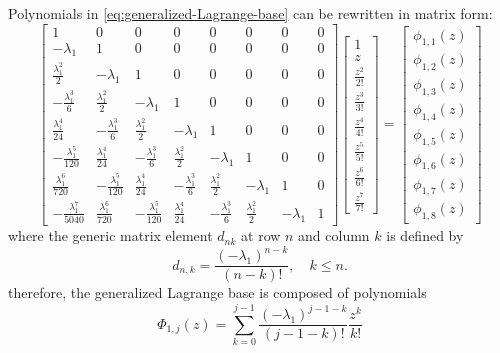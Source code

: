 Polynomials in \autoref{eq:generalized-Lagrange-base} can be rewritten in matrix form:
\begin{displaymath}
\left[\begin{matrix}1 & 0 & 0 & 0 & 0 & 0 & 0 & 0\\- \lambda_{1} & 1 & 0 & 0 & 0 & 0 & 0 & 0\\\frac{\lambda_{1}^{2}}{2} & - \lambda_{1} & 1 & 0 & 0 & 0 & 0 & 0\\- \frac{\lambda_{1}^{3}}{6} & \frac{\lambda_{1}^{2}}{2} & - \lambda_{1} & 1 & 0 & 0 & 0 & 0\\\frac{\lambda_{1}^{4}}{24} & - \frac{\lambda_{1}^{3}}{6} & \frac{\lambda_{1}^{2}}{2} & - \lambda_{1} & 1 & 0 & 0 & 0\\- \frac{\lambda_{1}^{5}}{120} & \frac{\lambda_{1}^{4}}{24} & - \frac{\lambda_{1}^{3}}{6} & \frac{\lambda_{1}^{2}}{2} & - \lambda_{1} & 1 & 0 & 0\\\frac{\lambda_{1}^{6}}{720} & - \frac{\lambda_{1}^{5}}{120} & \frac{\lambda_{1}^{4}}{24} & - \frac{\lambda_{1}^{3}}{6} & \frac{\lambda_{1}^{2}}{2} & - \lambda_{1} & 1 & 0\\- \frac{\lambda_{1}^{7}}{5040} & \frac{\lambda_{1}^{6}}{720} & - \frac{\lambda_{1}^{5}}{120} & \frac{\lambda_{1}^{4}}{24} & - \frac{\lambda_{1}^{3}}{6} & \frac{\lambda_{1}^{2}}{2} & - \lambda_{1} & 1\end{matrix}\right] \left[\begin{matrix}1\\z\\\frac{z^{2}}{2!}\\\frac{z^{3}}{3!}\\\frac{z^{4}}{4!}\\\frac{z^{5}}{5!}\\\frac{z^{6}}{6!}\\\frac{z^{7}}{7!}\end{matrix}\right] = \left[\begin{matrix}\phi_{ 1, 1 }{\left (z \right )}\\\phi_{ 1, 2 }{\left (z \right )}\\\phi_{ 1, 3 }{\left (z \right )}\\\phi_{ 1, 4 }{\left (z \right )}\\\phi_{ 1, 5 }{\left (z \right )}\\\phi_{ 1, 6 }{\left (z \right )}\\\phi_{ 1, 7 }{\left (z \right )}\\\phi_{ 1, 8 }{\left (z \right )}\end{matrix}\right]
\end{displaymath}
where the generic matrix element $d_{nk}$ at row $n$ and column $k$ is defined by 
\begin{displaymath}
    d_{n,k} = \frac{\left(-\lambda_{1}\right)^{n-k}}{\left(n-k\right)!}, \quad k\leq n.
\end{displaymath}
therefore, the generalized Lagrange base is composed of polynomials
\begin{displaymath}
  \Phi_{1,j}(z) = \sum_{k=0}^{j-1}{\frac{(-\lambda_{1})^{j-1-k}}{(j-1-k)!}\frac{z^{k}}{k!}}
\end{displaymath}

